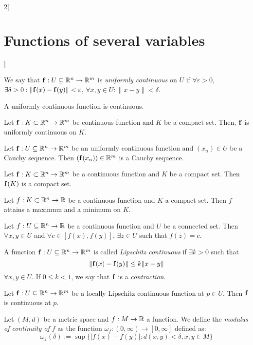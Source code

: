 \documentclass[../../../main.tex]{subfiles}
\begin{document}
\begin{multicols}{2}[\section{Functions of several variables}]
\begin{definition}
    We say that $\boldsymbol{\mathrm{f}}:U\subseteq\mathbb{R}^n\rightarrow\mathbb{R}^m$ is \textit{uniformly continuous} on $U$ if $\forall\varepsilon>0$, $\exists\delta>0:\|\boldsymbol{\mathrm{f}}(x)-\boldsymbol{\mathrm{f}}(y)\|<\varepsilon$, $\forall x,y\in U:\|x-y\|<\delta$.
  \end{definition}
  \begin{corollary}
    A uniformly continuous function is continuous.
  \end{corollary}
  \begin{theorem}
    Let $\boldsymbol{\mathrm{f}}:K\subset\mathbb{R}^n\rightarrow\mathbb{R}^m$ be continuous function and $K$ be a compact set. Then, $\boldsymbol{\mathrm{f}}$ is uniformly continuous on $K$.
  \end{theorem}
  \begin{theorem}
    Let $\boldsymbol{\mathrm{f}}:U\subseteq\mathbb{R}^n\rightarrow\mathbb{R}^m$ be an uniformly continuous function and $(x_n)\in U$ be a Cauchy sequence. Then $(\boldsymbol{\mathrm{f}}(x_n))\in\mathbb{R}^m$ is a Cauchy sequence.
  \end{theorem}
  \begin{theorem}
    Let $\boldsymbol{\mathrm{f}}:K\subset\mathbb{R}^n\rightarrow\mathbb{R}^m$ be a continuous function and $K$ be a compact set. Then $\boldsymbol{\mathrm{f}}(K)$ is a compact set.
  \end{theorem}
  \begin{theorem}
    Let $f:K\subset\mathbb{R}^n\rightarrow\mathbb{R} $ be a continuous function and $K$ a compact set. Then $f$ attains a maximum and a minimum on $K$.
  \end{theorem}
  \begin{theorem}
    Let $f:U\subseteq\mathbb{R}^n\rightarrow\mathbb{R} $ be a continuous function and $U$ be a connected set. Then $\forall x,y\in U$ and $\forall c\in[f(x),f(y)]$, $\exists z\in U$ such that $f(z)=c$.
  \end{theorem}
  \begin{definition}
    A function $\boldsymbol{\mathrm{f}}:U\subseteq\mathbb{R}^n\rightarrow\mathbb{R}^m$ is called \textit{Lipschitz continuous} if $\exists k>0$ such that $$\|\boldsymbol{\mathrm{f}}(x)-\boldsymbol{\mathrm{f}}(y)\|\leq k\|x-y\|$$ $\forall x,y\in U$. If $0\leq k<1$, we say that $\boldsymbol{\mathrm{f}}$ is a \textit{contraction}.
    \label{FOSV_contr}
  \end{definition}
  \begin{prop}
    Let $\boldsymbol{\mathrm{f}}:U\subseteq\mathbb{R}^n\rightarrow\mathbb{R}^m$ be a locally Lipschitz continuous function at $p\in U$. Then $\boldsymbol{\mathrm{f}}$ is continuous at $p$.
  \end{prop}
  \begin{definition}
    Let $(M,d)$ be a metric space and $f:M\rightarrow\mathbb{R} $ a function. We define the \textit{modulus of continuity of $f$} as the function $\omega_f:(0,\infty)\rightarrow[0,\infty]$ defined as: $$\omega_f(\delta):=\sup\{|f(x)-f(y)|:d(x,y)<\delta, x,y\in M\}$$
  \end{definition}

\end{multicols}
\end{document}
